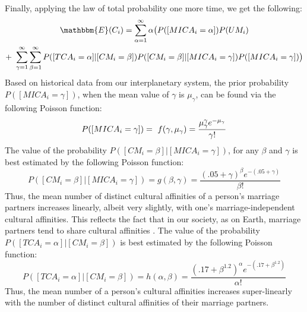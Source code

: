 Finally, applying the law of total probability one more time, we get the following:
\begin{multline}
    \mathbbm{E}(C_{i})=\sum_{\alpha=1}^{\infty}\alpha\big(P([MICA_{i}=\alpha])P(UM_{i}) \\ + \    \sum_{\gamma=1}^{\infty}\sum_{\beta=1}^{\infty} P([TCA_{i}=\alpha]|[CM_{i}=\beta]) P([CM_{i}=\beta]|[MICA_{i}=\gamma])P([MICA_{i}=\gamma])\big)
\end{multline}
Based on historical data from our interplanetary system, the prior probability $P([MICA_{i}=\gamma])$, when the mean value of $\gamma$ is $\mu_{\gamma}$, can be found via the following Poisson function:
\begin{equation}
    P([MICA_{i}=\gamma]) \\ = \ f(\gamma,\mu_{\gamma})=\frac{\mu_{\gamma}^{\gamma}e^{-\mu_{\gamma}}}{\gamma!}
\end{equation}
The value of the probability $P([CM_{i}=\beta]|[MICA_{i}=\gamma])$, for any $\beta$ and $\gamma$ is best estimated by the following Poisson function:
\begin{equation}
    P([CM_{i}=\beta]|[MICA_{i}=\gamma])= g(\beta,\gamma)=\frac{(.05+\gamma)^{\beta}e^{-(.05+\gamma)}}{\beta!}
\end{equation}
Thus, the mean number of distinct cultural affinities of a person's marriage partners increases linearly, albeit very slightly, with one's marriage-independent cultural affinities. This reflects the fact that in our society, as on Earth, marriage partners tend to share cultural affinities \cite{Schwartz2013}. The value of the probability $P([TCA_{i}=\alpha]|[CM_{i}=\beta])$ is best estimated by the following Poisson function:
\begin{equation}
    P([TCA_{i}=\alpha]|[CM_{i}=\beta]) = h(\alpha,\beta)=\frac{(.17+\beta^{1.2})^{\alpha}e^{-(.17+\beta^{1.2})}}{\alpha!}
\end{equation}
Thus, the mean number of a person's cultural affinities increases super-linearly with the number of distinct cultural affinities of their marriage partners.\par 

